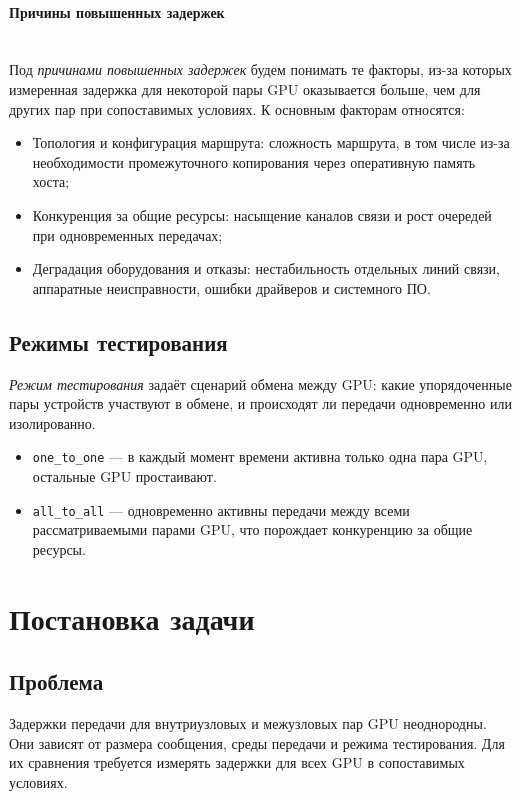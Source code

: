 \documentclass[a4paper,14pt]{extarticle}
\begin{document}
\paragraph{Причины повышенных задержек}\mbox{}\\
\indent Под \emph{причинами повышенных задержек} будем понимать те факторы, из-за которых измеренная задержка для некоторой пары GPU оказывается больше, чем для других пар при сопоставимых условиях. К основным факторам относятся:
\begin{itemize}[leftmargin=2.1cm, itemsep=0.15em, topsep=0.15em, parsep=0pt, partopsep=0pt]
	\item Топология и конфигурация маршрута: сложность маршрута, в том числе из-за необходимости промежуточного копирования через оперативную память хоста;
	\item Конкуренция за общие ресурсы: насыщение каналов связи и рост очередей при одновременных передачах;
	\item Деградация оборудования и отказы: нестабильность отдельных линий связи, аппаратные неисправности, ошибки драйверов и системного ПО.
\end{itemize}

\subsection{Режимы тестирования}
\label{sec:test-modes}
\indent \emph{Режим тестирования} задаёт сценарий обмена между GPU: какие упорядоченные пары устройств участвуют в обмене, и происходят ли передачи одновременно или изолированно.
\begin{itemize}
	\item \texttt{one\_to\_one} --- в каждый момент времени активна только одна пара GPU, остальные GPU простаивают.
	\item \texttt{all\_to\_all} --- одновременно активны передачи между всеми рассматриваемыми парами GPU, что порождает конкуренцию за общие ресурсы.
\end{itemize}

\newpage
\section{Постановка задачи}

\subsection{Проблема}
\indent Задержки передачи для внутриузловых и межузловых пар GPU неоднородны. Они зависят от размера сообщения, среды передачи и режима тестирования. Для их сравнения требуется измерять задержки для всех GPU в сопоставимых условиях.
\end{document}
